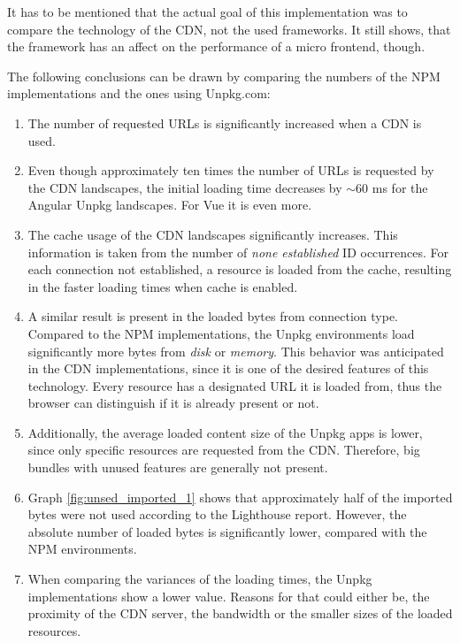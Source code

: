 It has to be mentioned that the actual goal of this implementation was to compare the technology of the CDN, not the used frameworks. It still shows, that the framework has an affect on the performance of a micro frontend, though.

The following conclusions can be drawn by comparing the numbers of the NPM implementations and the ones using Unpkg.com:

\begin{enumerate}
	\item The number of requested URLs is significantly increased when a CDN is used.
	
	\item Even though approximately ten times the number of URLs is requested by the CDN landscapes, the initial loading time decreases by $\sim$60 ms for the Angular Unpkg landscapes. For Vue it is even more.
	
	\item The cache usage of the CDN landscapes significantly increases. This information is taken from the number of \textit{none established} ID occurrences. For each connection not established, a resource is loaded from the cache, resulting in the faster loading times when cache is enabled.
	
	\item A similar result is present in the loaded bytes from connection type. Compared to the NPM implementations, the Unpkg environments load significantly more bytes from \textit{disk} or \textit{memory}. This behavior was anticipated in the CDN implementations, since it is one of the desired features of this technology. Every resource has a designated URL it is loaded from, thus the browser can distinguish if it is already present or not.
	
	\item Additionally, the average loaded content size of the Unpkg apps is lower, since only specific resources are requested from the CDN. Therefore, big bundles with unused features are generally not present.
	
	\item Graph \ref{fig:unsed_imported_1} shows that approximately half of the imported bytes were not used according to the Lighthouse report. However, the absolute number of loaded bytes is significantly lower, compared with the NPM environments.
	
	\item When comparing the variances of the loading times, the Unpkg implementations show a lower value. Reasons for that could either be, the proximity of the CDN server, the bandwidth or the smaller sizes of the loaded resources.
\end{enumerate}

